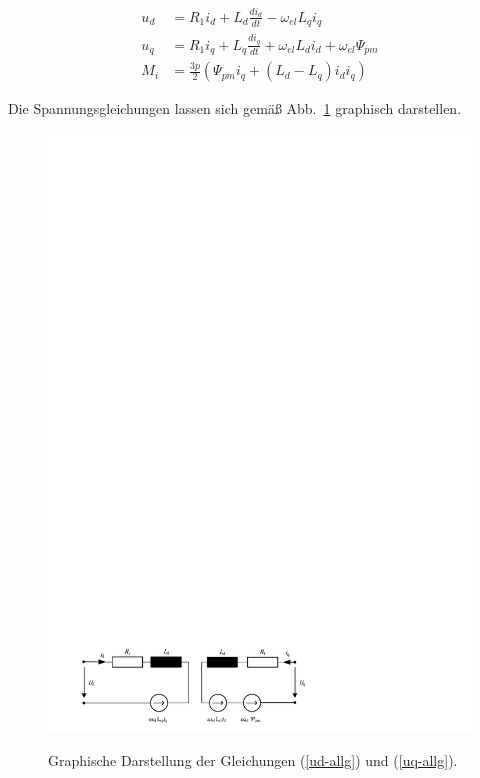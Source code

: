 \documentclass[conference,twocolumn]{IEEEtran}
\begin{document}
\begin{align}
u_d &= R_1 i_d + L_d \frac{di_d}{dt} - \omega_{el}L_q i_q  \label{uq-allg} \\ 
u_q &= R_1 i_q + L_q \frac{di_q}{dt} + \omega_{el}L_d i_d + \omega_{el}\Psi_{pm} \label{ud-allg} \\ 
M_i &= \frac{3p}{2}(\Psi_{pm} i_q + (L_d - L_q)i_d i_q)
\end{align}

Die Spannungsgleichungen lassen sich gemäß Abb.~\ref{fig:spannungsgleichungen} graphisch darstellen.

\begin{figure}
\includegraphics[width=\columnwidth]{img/spannungsgleichungen}
\label{fig:spannungsgleichungen}
\caption{Graphische Darstellung der Gleichungen (\ref{ud-allg}) und (\ref{uq-allg}).}
\end{figure}
\end{document}
